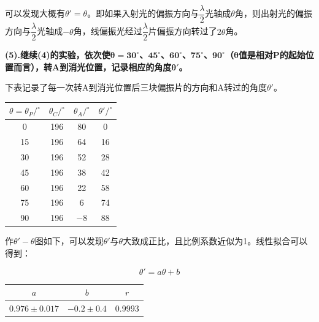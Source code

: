 \documentclass[a4paper,fontset=windows]{ctexart}
\begin{document}
{可以发现大概有$\theta' = \theta$。即如果入射光的偏振方向与$\dfrac{\lambda}{2}$光轴成$\theta$角，则出射光的偏振方向与$\dfrac{\lambda}{2}$光轴成$-\theta$角，线偏振光经过$\dfrac{\lambda}{2}$片偏振方向转过了$2\theta$角。

\bigskip
\textbf{(5).继续(4)的实验，依次使$\boldsymbol{\theta = 30^\circ}$、$\boldsymbol{45^\circ}$、$\boldsymbol{60^\circ}$、$\boldsymbol{75^\circ}$、$\boldsymbol{90^\circ}$（$\boldsymbol{\theta}$值是相对P的起始位置而言），转A到消光位置，记录相应的角度$\boldsymbol{\theta'}$。}

下表记录了每一次转A到消光位置后三块偏振片的方向和A转过的角度$\theta'$。

\vspace{0.5em}
\begin{table}[ht!]\linespread{1.2}\selectfont
    \begin{center}
        \begin{tabular}{ |c|c|c|c| }
            \hline
            $\theta = \theta_P/^\circ$ & $\theta_C/^\circ$ & $\theta_A/^\circ$ & $\theta'/^\circ$ \\
            \hline
            0 & 196 & 80 & 0 \\
            \hline
            15 & 196 & 64 & 16 \\
            \hline
            30 & 196 & 52 & 28 \\
            \hline
            45 & 196 & 38 & 42 \\
            \hline
            60 & 196 & 22 & 58 \\
            \hline
            75 & 196 & 6 & 74 \\
            \hline
            90 & 196 & $-8$ & 88 \\
            \hline
        \end{tabular}
    \end{center}
\end{table}\vspace{-0.5em}

作$\theta'-\theta$图如下，可以发现$\theta'$与$\theta$大致成正比，且比例系数近似为1。线性拟合可以得到：

\vspace{-3em}
\[\theta'=a\theta+b\]

\vspace{-0.5em}
\begin{table}[ht!]\linespread{1.2}\selectfont
    \begin{center}
        \begin{tabular}{ |c|c|c| }
            \hline
            $a$ & $b$ & $r$ \\
            \hline
            $0.976\pm0.017$ & $-0.2\pm0.4$ & 0.9993 \\
            \hline
        \end{tabular}
    \end{center}
\end{table}

}
\end{document}
